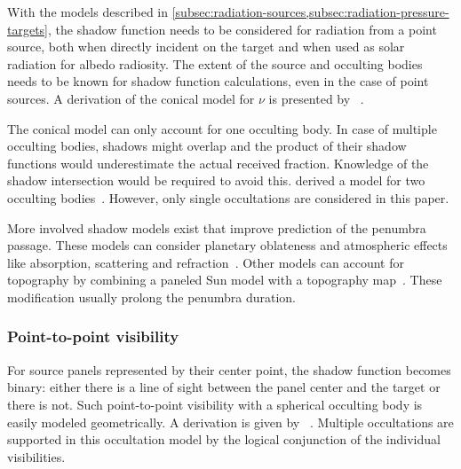With the models described in \cref{subsec:radiation-sources,subsec:radiation-pressure-targets}, the shadow function needs to be considered for radiation from a point source, both when directly incident on the target and when used as solar radiation for albedo radiosity. The extent of the source and occulting bodies needs to be known for shadow function calculations, even in the case of point sources. A derivation of the conical model for $\nu$ is presented by \citeauthor{Montenbruck2000}~\cite{Montenbruck2000}.

The conical model can only account for one occulting body. In case of multiple occulting bodies, shadows might overlap and the product of their shadow functions would underestimate the actual received fraction. Knowledge of the shadow intersection would be required to avoid this. \citeauthor{Zhang2019} derived a model for two occulting bodies~\cite{Zhang2019}. However, only single occultations are considered in this paper.

More involved shadow models exist that improve prediction of the penumbra passage. These models can consider planetary oblateness and atmospheric effects like absorption, scattering and refraction~\cite{Li2019}. Other models can account for topography by combining a paneled Sun model with a topography map~\cite{Mazarico2018}. These modification usually prolong the penumbra duration.


\subsubsection{Point-to-point visibility}
For source panels represented by their center point, the shadow function becomes binary: either there is a line of sight between the panel center and the target or there is not. Such point-to-point visibility with a spherical occulting body is easily modeled geometrically. A derivation is given by \citeauthor{Vallado2013}~\cite{Vallado2013}. Multiple occultations are supported in this occultation model by the logical conjunction of the individual visibilities.
